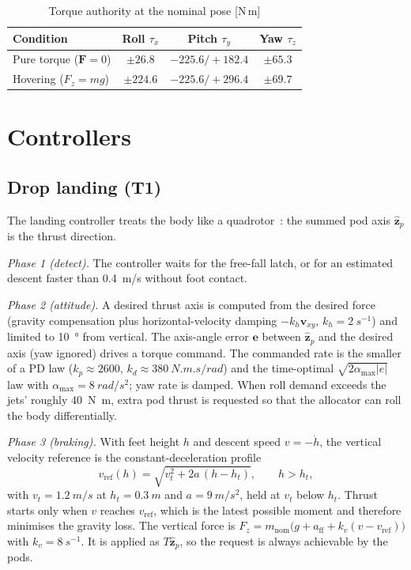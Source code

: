 \documentclass[conference]{IEEEtran}
\newcommand{\vect}[1]{\boldsymbol{#1}}
\begin{document}
\begin{table}[t]
\centering
\caption{Torque authority at the nominal pose [N\,m]}
\label{tab:auth}
\begin{tabular}{@{}lccc@{}}
\toprule
Condition & Roll $\tau_x$ & Pitch $\tau_y$ & Yaw $\tau_z$\\
\midrule
Pure torque ($\vect F=0$) & $\pm 26.8$ & $-225.6/+182.4$ & $\pm 65.3$ \\
Hovering ($F_z=mg$) & $\pm 224.6$ & $-225.6/+296.4$ & $\pm 69.7$ \\
\bottomrule
\end{tabular}
\end{table}

\section{Controllers}
\label{sec:ctrl}

\subsection{Drop landing (T1)}
The landing controller treats the body like a quadrotor~\cite{lee2010geometric,mellinger2011minimum}: the summed pod axis $\hat{\vect z}_p$ is the thrust direction.

\emph{Phase 1 (detect).} The controller waits for the free-fall latch, or for an estimated descent faster than \SI{0.4}{m/s} without foot contact.

\emph{Phase 2 (attitude).} A desired thrust axis is computed from the desired force (gravity compensation plus horizontal-velocity damping $-k_h\vect v_{xy}$, $k_h=\SI{2}{s^{-1}}$) and limited to \SI{10}{\degree} from vertical. The axis-angle error $\vect e$ between $\hat{\vect z}_p$ and the desired axis (yaw ignored) drives a torque command. The commanded rate is the smaller of a PD law ($k_p\approx2600$, $k_d\approx\SI{380}{N.m.s/rad}$) and the time-optimal $\sqrt{2\alpha_{\max}|e|}$ law with $\alpha_{\max}=\SI{8}{rad/s^2}$; yaw rate is damped. When roll demand exceeds the jets' roughly \SI{40}{N.m}, extra pod thrust is requested so that the allocator can roll the body differentially.

\emph{Phase 3 (braking).} With feet height $h$ and descent speed $v=-\dot h$, the vertical velocity reference is the constant-deceleration profile
\begin{equation}
v_{\text{ref}}(h) = \sqrt{v_t^2 + 2a\,(h-h_t)},\qquad h>h_t,
\label{eq:profile}
\end{equation}
with $v_t=\SI{1.2}{m/s}$ at $h_t=\SI{0.3}{m}$ and $a=\SI{9}{m/s^2}$, held at $v_t$ below $h_t$. Thrust starts only when $v$ reaches $v_{\text{ref}}$, which is the latest possible moment and therefore minimises the gravity loss. The vertical force is $F_z=m_{\text{nom}}\big(g+a_{\text{ff}}+k_v(v-v_{\text{ref}})\big)$ with $k_v=\SI{8}{s^{-1}}$. It is applied as $T\hat{\vect z}_p$, so the request is always achievable by the pods.
\end{document}
